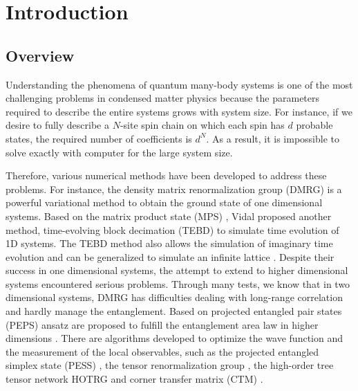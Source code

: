 \chapter{Introduction}
\label{chapter:Introduction}

\section{Overview}
\label{overview}
Understanding the phenomena of quantum many-body systems is one of the most challenging problems in condensed matter physics because the parameters required to describe the entire systems grows with system size. For instance, if we desire to fully describe a $N$-site spin chain on which each spin has $d$ probable states, the required number of coefficients is $d^N$. As a result, it is impossible to solve exactly with computer for the large system size.

Therefore, various numerical methods have been developed to address these problems. For instance, the density matrix renormalization group (DMRG) \cite{PhysRevLett.69.2863, PhysRevB.48.10345} is a powerful variational method to obtain the ground state of one dimensional systems. Based on the matrix product state (MPS) \cite{PhysRevB.73.094423, PhysRevLett.75.3537}, Vidal proposed another method, time-evolving block decimation (TEBD) to simulate time evolution of 1D systems. The TEBD \cite{PhysRevLett.91.147902, PhysRevLett.93.040502} method also allows the simulation of imaginary time evolution and can be generalized to simulate an infinite lattice \cite{PhysRevLett.98.070201, PhysRevB.78.155117}. 
Despite their success in one dimensional systems, the attempt to extend to higher dimensional systems encountered serious problems. Through many tests, we know that in two dimensional systems, DMRG has difficulties dealing with long-range correlation and hardly manage the entanglement. Based on projected entangled pair states (PEPS) ansatz are proposed to fulfill the entanglement area law in higher dimensions \cite{RevModPhys.82.277, PhysRevA.75.033605, jordan_studies_2011}. There are algorithms developed to optimize the wave function  and the measurement of the local observables, such as the projected entangled simplex state (PESS) \cite{PhysRevX.4.011025}, the tensor renormalization group \cite{PhysRevLett.99.120601,PhysRevB.78.205116,PhysRevB.80.155131}, the high-order tree tensor network HOTRG \cite{PhysRevB.86.045139} and corner transfer matrix (CTM) \cite{doi:10.1143/JPSJ.65.891,PhysRevB.80.094403}.

